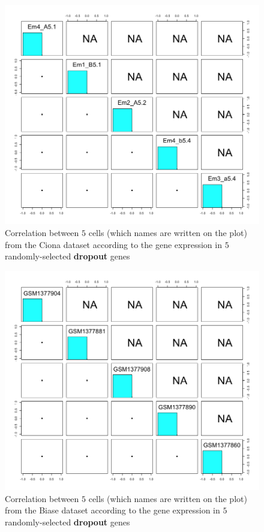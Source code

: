 \documentclass{report}
\begin{document}
{\begin{figure}[H]
\centering
\includegraphics[scale=0.4]{plotsCopula/ciona/depCellnGene_dropout_ciona.png}
\caption{Correlation between $5$ cells (which names are written on the plot) from the Ciona dataset according to the gene expression in $5$ randomly-selected \textbf{dropout} genes}
\label{cellcorrelationdropout2}
\end{figure}

\begin{figure}[H]
\centering
\includegraphics[scale=0.4]{plotsCopula/biase/depCellnGene_dropout_biase.png}
\caption{Correlation between $5$ cells (which names are written on the plot) from the Biase dataset according to the gene expression in $5$ randomly-selected \textbf{dropout} genes}
\label{cellcorrelationdropout3}
\end{figure}

}
\end{document}

